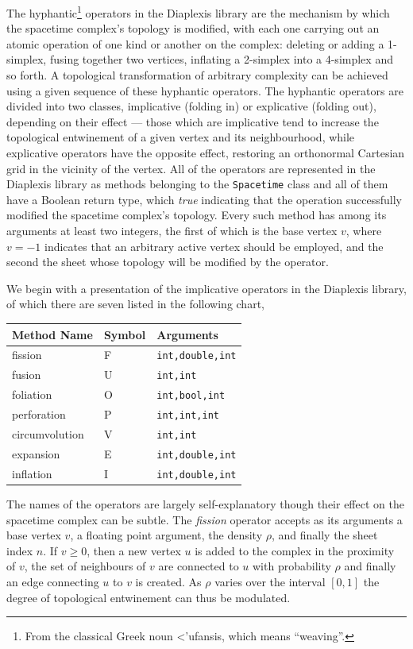 \documentclass[12pt,letterpaper]{report}
\begin{document}
The hyphantic\footnote{From the classical Greek noun \greektext<'ufansis\latintext, which 
means ``weaving''.} operators in the Diaplexis library are the mechanism by which the spacetime 
complex's topology is modified, with each one carrying out an atomic operation of one kind or 
another on the complex: deleting or adding a 1-simplex, fusing together two vertices, inflating 
a 2-simplex into a 4-simplex and so forth. A topological transformation of arbitrary complexity 
can be achieved using a given sequence of these hyphantic operators. The hyphantic operators 
are divided into two classes, implicative (folding in) or explicative (folding out), depending on 
their effect --- those which are implicative tend to increase the topological entwinement of a given 
vertex and its neighbourhood, while explicative operators have the opposite effect, restoring an 
orthonormal Cartesian grid in the vicinity of the vertex. All of the operators are represented 
in the Diaplexis library as methods belonging to the \texttt{Spacetime} class and all of them have 
a Boolean return type, which \emph{true} indicating that the operation successfully modified the 
spacetime complex's topology. Every such method has among its arguments at least two integers, 
the first of which is the base vertex $v$, where $v = -1$ indicates that an arbitrary active 
vertex should be employed, and the second the sheet whose topology will be modified by the 
operator. 

We begin with a presentation of the implicative operators in the Diaplexis library, of which there 
are seven listed in the following chart,    
\begin{center}
\begin{tabular}{|l|l|l|}
\hline
Method Name & Symbol & Arguments \\ 
\hline \hline
fission & F & \texttt{{int,double,int}} \\
fusion & U & \texttt{{int,int}} \\
foliation & O & \texttt{{int,bool,int}} \\
perforation & P & \texttt{{int,int,int}} \\
circumvolution & V & \texttt{{int,int}} \\ 
expansion & E & \texttt{{int,double,int}} \\ 
inflation & I & \texttt{{int,double,int}} \\ 
\hline
\end{tabular}
\end{center}
The names of the operators are largely self-explanatory though their effect on the spacetime complex 
can be subtle. The \emph{fission} operator accepts as its arguments a base vertex $v$, a floating point 
argument, the density $\rho$, and finally the sheet index $n$. If $v \ge 0$, then a new vertex 
$u$ is added to the complex in the proximity of $v$, the set of neighbours of $v$ are connected to 
$u$ with probability $\rho$ and finally an edge connecting $u$ to $v$ is created. As $\rho$ varies 
over the interval $[0,1]$ the degree of topological entwinement can thus be modulated. 
\end{document}
